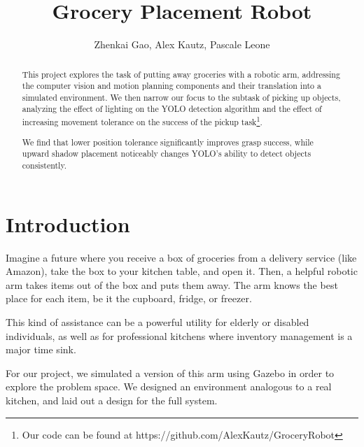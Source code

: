 \documentclass{article}
\title{Grocery Placement Robot}
\author{Zhenkai Gao, Alex Kautz, Pascale Leone}
\date{\vspace{-1em}}
\begin{document}
\maketitle

\begin{abstract}

This project explores the task of putting away groceries with a robotic arm, addressing the computer vision and motion planning components and their translation into a simulated environment. We then narrow our focus to the subtask of picking up objects, analyzing the effect of lighting on the YOLO detection algorithm and the effect of increasing movement tolerance on the success of the pickup task\footnote{Our code can be found at https://github.com/AlexKautz/GroceryRobot}.

We find that lower position tolerance significantly improves grasp success, while upward shadow placement noticeably changes YOLO's ability to detect objects consistently.

\end{abstract}

\section{Introduction}


Imagine a future where you receive a box of groceries from a delivery service (like Amazon), take the box to your kitchen table, and open it. Then, a helpful robotic arm takes items out of the box and puts them away. The arm knows the best place for each item, be it the cupboard, fridge, or freezer.

This kind of assistance can be a powerful utility for elderly or disabled individuals, as well as for professional kitchens where inventory management is a major time sink.

For our project, we simulated a version of this arm using Gazebo in order to explore the problem space. We designed an environment analogous to a real kitchen, and laid out a design for the full system.
\end{document}
